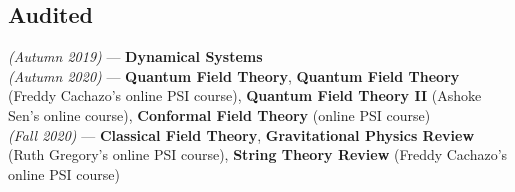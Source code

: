 \documentclass[11pt, a4paper]{article}
\begin{document}
\subsection{\large Audited}
\hspace{0.01\linewidth}
\parbox{0.88\linewidth}{
    {\textit{(Autumn 2019)} --- \small \textbf{Dynamical Systems}} \\
    {\textit{(Autumn 2020)} --- \small \textbf{Quantum Field Theory}, \textbf{Quantum Field Theory} (Freddy Cachazo's online PSI course), \textbf{Quantum Field Theory II} (Ashoke Sen's online course), \textbf{Conformal Field Theory} (online PSI course)} \\
    {\textit{(Fall 2020)} --- \small \textbf{Classical Field Theory}, \textbf{Gravitational Physics Review} (Ruth Gregory's online PSI course), \textbf{String Theory Review} (Freddy Cachazo's online PSI course)}
}
\end{document}
